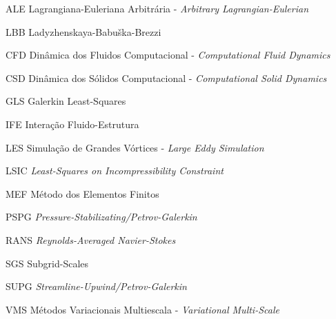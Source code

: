 \documentclass[12pt,
	openright,	%
	twoside,    %
	a4paper,			%
	sumario=tradicional,
	english,			%
	french, 			%
	brazil				%
]{USPSC}
\begin{document}
\listoffigures*
\cleardoublepage
\listoftables*
\cleardoublepage
\begin{siglas}
    \item[ALE] Lagrangiana-Euleriana Arbitrária - \textit{Arbitrary Lagrangian-Eulerian}
    \item[LBB] Ladyzhenskaya-Babuška-Brezzi
    \item[CFD] Dinâmica dos Fluidos Computacional - \textit{Computational Fluid Dynamics}
    \item[CSD] Dinâmica dos Sólidos Computacional - \textit{Computational Solid Dynamics}
    \item[GLS] Galerkin Least-Squares
    \item[IFE] Interação Fluido-Estrutura
    \item[LES] Simulação de Grandes Vórtices - \textit{Large Eddy Simulation}
    \item[LSIC] \textit{Least-Squares on Incompressibility Constraint}
    \item[MEF] Método dos Elementos Finitos
    \item[PSPG] \textit{Pressure-Stabilizating/Petrov-Galerkin}
    \item[RANS] \textit{Reynolds-Averaged Navier-Stokes}
    \item[SGS] Subgrid-Scales
    \item[SUPG] \textit{Streamline-Upwind/Petrov-Galerkin}
    \item[VMS] Métodos Variacionais Multiescala - \textit{Variational Multi-Scale}
\end{siglas}
\end{document}
